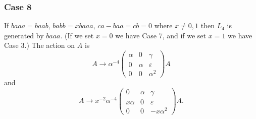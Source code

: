 \documentclass[12pt]{article}
\begin{document}
\subsubsection{Case 8}

If $baaa=baab,\,babb=xbaaa,\,ca-baa=cb=0$ where $x\neq 0,1$ then $L_{4}$ is
generated by $baaa$. (If we set $x=0$ we have Case 7, and if we set $x=1$ we
have Case 3.) The action on $A$ is 
\[
A\rightarrow \alpha ^{-4}\left( 
\begin{array}{lll}
\alpha  & 0 & \gamma  \\ 
0 & \alpha  & \varepsilon  \\ 
0 & 0 & \alpha ^{2}%
\end{array}%
\right) A
\]%
and 
\[
A\rightarrow x^{-2}\alpha ^{-4}\left( 
\begin{array}{lll}
0 & \alpha  & \gamma  \\ 
x\alpha  & 0 & \varepsilon  \\ 
0 & 0 & -x\alpha ^{2}%
\end{array}%
\right) A.
\]
\end{document}
